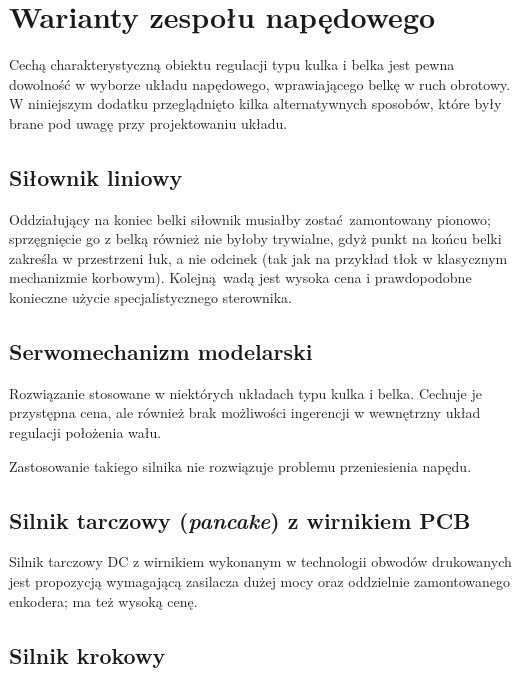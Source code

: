 \chapter{Warianty zespołu napędowego}
\label{appA_warianty_zespolu_napedowego}

Cechą charakterystyczną obiektu regulacji typu kulka i belka jest pewna dowolność w wyborze układu napędowego, wprawiającego belkę w ruch obrotowy. W niniejszym dodatku przeglądnięto kilka alternatywnych sposobów, które były brane pod uwagę przy projektowaniu układu.

\section{Siłownik liniowy}

Oddziałujący na koniec belki siłownik musiałby zostać zamontowany pionowo; sprzęgnięcie go z belką również nie byłoby trywialne, gdyż punkt na końcu belki zakreśla w przestrzeni łuk, a nie odcinek (tak jak na przykład tłok w klasycznym mechanizmie korbowym). Kolejną wadą jest wysoka cena i prawdopodobne konieczne użycie specjalistycznego sterownika.

\section{Serwomechanizm modelarski}

Rozwiązanie stosowane w niektórych układach typu kulka i belka. Cechuje je przystępna cena, ale również brak możliwości ingerencji w wewnętrzny układ regulacji położenia wału.

Zastosowanie takiego silnika nie rozwiązuje problemu przeniesienia napędu.

\section{Silnik tarczowy (\textit{pancake}) z wirnikiem PCB}

Silnik tarczowy DC z wirnikiem wykonanym w technologii obwodów drukowanych jest propozycją wymagającą zasilacza dużej mocy oraz oddzielnie zamontowanego enkodera; ma też wysoką cenę.

\section{Silnik krokowy}